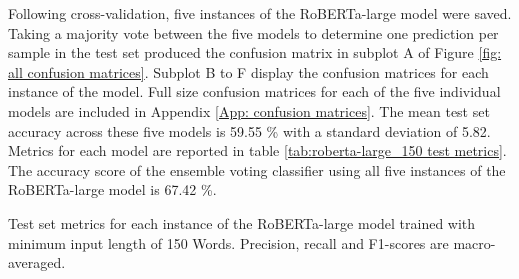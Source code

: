 \documentclass[12pt]{report}
\begin{document}
Following cross-validation, five instances of the RoBERTa-large model were saved.
Taking a majority vote between the five models to determine one prediction per sample in the test set produced the confusion matrix in subplot A of Figure \ref{fig: all confusion matrices}.
Subplot B to F display the confusion matrices for each instance of the model.
Full size confusion matrices for each of the five individual models are included in Appendix \ref{App: confusion matrices}.
The mean test set accuracy across these five models is 59.55 \% with a standard deviation of 5.82.
Metrics for each model are reported in table \ref{tab:roberta-large_150 test metrics}.
The accuracy score of the ensemble voting classifier using all five instances of the RoBERTa-large model is 67.42 \%.

\begin{table}
    \begin{adjustbox}{width=1\textwidth}
        
    \end{adjustbox}
    \caption{Test set metrics for each instance of the RoBERTa-large model trained with minimum input length of 150 Words. Precision, recall and F1-scores are macro-averaged.}
    \label{tab:roberta-large_150 test metrics}
\end{table}
\end{document}
